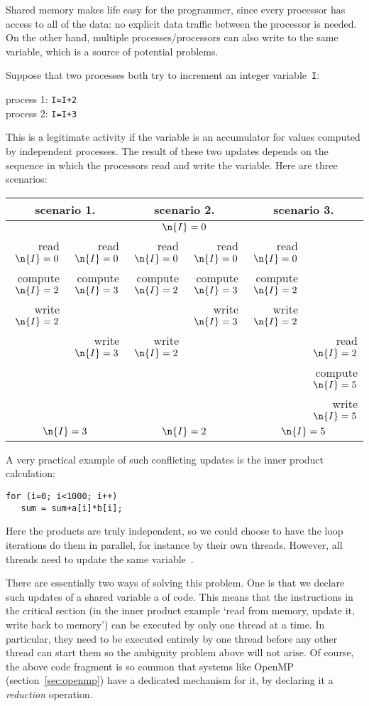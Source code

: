 Shared memory makes life easy for the programmer, since every
processor has access to all of the data: no explicit data traffic
between the processor is needed. On the other hand, multiple
processes/processors can also write to the same variable, which is a
source of potential problems.

Suppose that two processes both try to increment an integer
variable~\texttt{I}:
\begin{tabbing}
  process 1: \texttt{I=I+2}\\
  process 2: \texttt{I=I+3}
\end{tabbing}
This is a legitimate activity if the variable is an accumulator for
values computed by independent processes.
The result of these two updates
depends on the sequence in which the processors read and
write the variable. Here are three scenarios:

\begin{tabular}{|rr|rr|rr|}
  \hline
  \multicolumn{2}{|c|}{scenario 1.}& \multicolumn{2}{|c|}{scenario 2.}&
  \multicolumn{2}{|c|}{scenario 3.}\\ \hline
  \multicolumn{6}{|c|}{$\n{I}=0$}\\ \hline
  read $\n{I}=0$&read $\n{I}=0$&
    read $\n{I}=0$&read $\n{I}=0$&
      read $\n{I}=0$& \\
  compute $\n{I}=2$&compute $\n{I}=3$& 
    compute $\n{I}=2$&compute $\n{I}=3$&
      compute $\n{I}=2$& \\
  write $\n{I}=2$& & &write $\n{I}=3$&write $\n{I}=2$& \\
  &write $\n{I}=3$&write $\n{I}=2$& & &read $\n{I}=2$\\
  &&&&&compute $\n{I}=5$\\
  &&&&&write $\n{I}=5$\\
  \hline
  \multicolumn{2}{|c|}{$\n{I}=3$}& \multicolumn{2}{|c|}{$\n{I}=2$}&
  \multicolumn{2}{|c|}{$\n{I}=5$}\\ \hline
\end{tabular}

A very practical example of such conflicting updates is the inner
product calculation:
\begin{verbatim}
for (i=0; i<1000; i++)
   sum = sum+a[i]*b[i];
\end{verbatim}
Here the products are truly independent, so we could choose to have
the loop iterations do them in parallel, for instance by their own
threads. However, all threads need to update the same variable~.

There are essentially two ways of solving this problem. 
One is that we declare such updates of a shared variable a
 of code. This means that the instructions
in the critical section (in the inner product example `read 
from memory, update it, write back to memory') can be executed by only
one thread at a time. In particular, they need to be executed
entirely by one thread before any other thread can start them so the
ambiguity problem above will not arise. Of course, the above code
fragment is so common that systems like OpenMP
(section~\ref{sec:openmp}) have a dedicated mechanism for it, by
declaring it a \emph{reduction}
operation.

